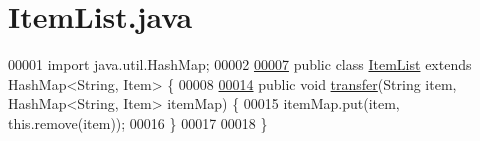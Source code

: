 \hypertarget{ItemList_8java_source}{\section{Item\-List.\-java}
}

\begin{DoxyCode}
00001 \textcolor{keyword}{import} java.util.HashMap;
00002 
\hypertarget{ItemList_8java_source_l00007}{}\hyperlink{classItemList}{00007} \textcolor{keyword}{public} \textcolor{keyword}{class }\hyperlink{classItemList}{ItemList} \textcolor{keyword}{extends} HashMap<String, Item> \{
00008 
\hypertarget{ItemList_8java_source_l00014}{}\hyperlink{classItemList_ae4e9a32c40b828af911c754db9fca614}{00014}     \textcolor{keyword}{public} \textcolor{keywordtype}{void} \hyperlink{classItemList_ae4e9a32c40b828af911c754db9fca614}{transfer}(String item, HashMap<String, Item> itemMap) \{
00015         itemMap.put(item, this.remove(item));
00016     \}
00017 
00018 \}
\end{DoxyCode}
